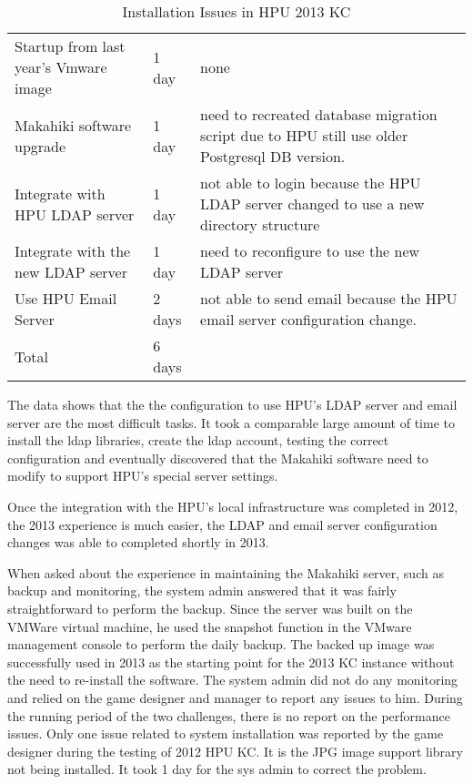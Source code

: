 \begin{table}[ht!]
  \centering
  \begin{tabular}{|P{0.28\columnwidth}|P{0.1\columnwidth}|p{0.5\columnwidth}|}
    \hline
      &
      &
      \\
    \hline
     Startup from last year's Vmware image & 1 day &  none\\
    \hline
     Makahiki software upgrade & 1 day & need to recreated database migration script due to HPU still use older Postgresql DB version. \\
    \hline
    Integrate with HPU LDAP server & 1 day  & not able to login because the HPU LDAP server changed to use a new directory structure \\
    \hline
     Integrate with the new LDAP server &  1 day &  need to reconfigure to use the new LDAP server\\
    \hline
    Use HPU Email Server & 2 days & not able to send email because the HPU email server configuration change. \\
    \hline
    Total & 6 days & \\
    \hline \end{tabular}
  \caption{Installation Issues in HPU 2013 KC }
  \label{fig:makahiki-install-hpu2013}
\end{table}

The data shows that the the configuration to use HPU's LDAP server and email server are the most difficult tasks. It took a comparable large amount of time to install the ldap libraries, create the ldap account, testing the correct configuration and eventually discovered that the Makahiki software need to modify to support HPU's special server settings. 

Once the integration with the HPU's local infrastructure was completed in 2012, the 2013 experience is much easier, the LDAP and email server configuration changes was able to completed shortly in 2013. 

When asked about the experience in maintaining the Makahiki server, such as backup and monitoring, the system admin answered that it was fairly straightforward to perform the backup. Since the server was built on the VMWare virtual machine, he used the snapshot function in the VMware management console to perform the daily backup. The backed up image was successfully used in 2013 as the starting point for the 2013 KC instance without the need to re-install the software. The system admin did not do any monitoring and relied on the game designer and manager to report any issues to him. During the running period of the two challenges, there is no report on the performance issues. Only one issue related to system installation was reported by the game designer during the testing of 2012 HPU KC. It is the JPG image support library not being installed. It took 1 day for the sys admin to correct the problem.

